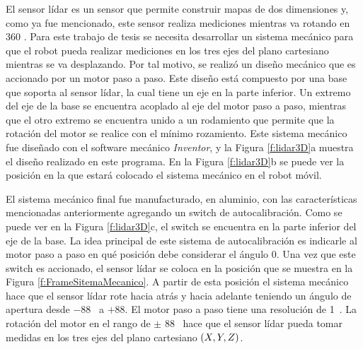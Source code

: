 
El sensor lídar es un sensor que permite construir mapas de dos dimensiones y, como ya 
fue mencionado, este sensor realiza mediciones mientras va rotando en 360 \grad. Para 
este trabajo de tesis se necesita desarrollar un sistema mecánico para que el robot 
pueda realizar mediciones en los tres ejes del plano cartesiano mientras se va 
desplazando. Por tal motivo, se realizó un diseño mecánico que es accionado por un motor
paso a paso. Este diseño está compuesto por una base que soporta al sensor lídar, la cual 
tiene un eje en la parte inferior. Un extremo del eje de la base se encuentra 
acoplado al eje del motor paso a paso, mientras que el otro extremo se encuentra unido 
a un rodamiento que permite que la rotación del motor se realice con el mínimo 
rozamiento. Este sistema mecánico fue diseñado con el software mecánico 
\textit{Inventor}, y la Figura \ref{f:lidar3D}a muestra el diseño realizado en 
este programa. En la Figura \ref{f:lidar3D}b se puede ver la posición en la que estará
colocado el sistema mecánico en el robot móvil.

El sistema mecánico final fue manufacturado, en aluminio, con las características mencionadas
anteriormente agregando un switch de autocalibración. Como se puede ver en la Figura 
\ref{f:lidar3D}c, el switch se encuentra en la parte inferior del eje de la base. La idea 
principal de este sistema de autocalibración es indicarle al motor paso a paso en qué posición 
debe considerar el ángulo 0\grad. Una vez que este switch es accionado, el sensor lídar se 
coloca en la posición que se muestra en la Figura \ref{f:FrameSitemaMecanico}. A partir de esta 
posición el sistema mecánico hace que el sensor lídar rote hacia atrás y hacia adelante teniendo 
un ángulo de apertura desde $-88$\grad~ a $+88$\grad. El motor paso a paso tiene una resolución
de 1\grad~. La rotación del motor en el rango de $\pm$ 88\grad~ hace que el sensor lídar pueda 
tomar medidas en los tres ejes del plano cartesiano $(\mathnormal X,\mathnormal Y,\mathnormal Z)$.

